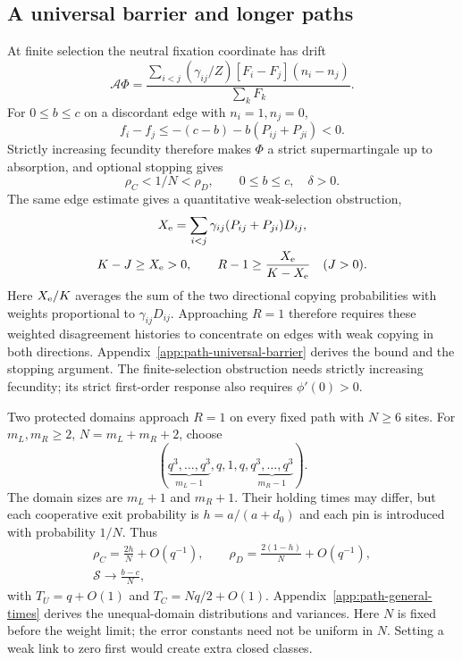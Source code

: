 \documentclass[aps,pre,reprint,amsmath,amssymb,longbibliography]{revtex4-2}
\begin{document}
\subsection{A universal barrier and longer paths}
\label{sec:universal-bound}\label{sec:long-domains}
At finite selection the neutral fixation coordinate has drift
\begin{equation}
 \mathcal A\Phi=
 \frac{\sum_{i<j}(\gamma_{ij}/Z)
        [F_i-F_j](n_i-n_j)}{\sum_kF_k}.
 \label{eq:supermartingale}
\end{equation}
For $0\le b\le c$ on a discordant edge with $n_i=1,n_j=0$,
\begin{equation}
 f_i-f_j\le -(c-b)-b(P_{ij}+P_{ji})<0.
 \label{eq:edge-obstruction}
\end{equation}
Strictly increasing fecundity therefore makes $\Phi$ a strict
supermartingale up to absorption, and optional stopping gives
\begin{equation}
 \rho_C<1/N<\rho_D,\qquad 0\le b\le c,\quad\delta>0.
 \label{eq:finite-no-go}
\end{equation}
The same edge estimate gives a quantitative weak-selection obstruction,
\begin{equation}
 \begin{gathered}
 X_{\rm e}=\sum_{i<j}\gamma_{ij}(P_{ij}+P_{ji})D_{ij},\\
 K-J\ge X_{\rm e}>0,\qquad
 R-1\ge\frac{X_{\rm e}}{K-X_{\rm e}}\quad(J>0).
 \end{gathered}
 \label{eq:edge-gap-bound}
\end{equation}
Here $X_{\rm e}/K$ averages the sum of the two directional copying
probabilities with weights proportional to $\gamma_{ij}D_{ij}$.
Approaching $R=1$ therefore requires these weighted disagreement
histories to concentrate on edges with weak copying in both directions.
Appendix~\ref{app:path-universal-barrier} derives the bound and the
stopping argument. The finite-selection obstruction needs strictly
increasing fecundity; its strict first-order response also requires
$\phi'(0)>0$.

Two protected domains approach $R=1$ on every fixed path with
$N\ge6$ sites. For $m_L,m_R\ge2$, $N=m_L+m_R+2$, choose
\begin{equation}
 (\underbrace{q^3,\ldots,q^3}_{m_L-1},q,1,q,
        \underbrace{q^3,\ldots,q^3}_{m_R-1}).
 \label{eq:long-path}
\end{equation}
The domain sizes are $m_L+1$ and $m_R+1$. Their holding times may
differ, but each cooperative exit probability is $h=a/(a+d_0)$ and
each pin is introduced with probability $1/N$. Thus
\begin{equation}
 \begin{gathered}
 \rho_C=\frac{2h}{N}+O(q^{-1}),\qquad
 \rho_D=\frac{2(1-h)}N+O(q^{-1}),\\
 \mathcal S\longrightarrow\frac{b-c}{N},
 \end{gathered}
 \label{eq:long-path-law}
\end{equation}
with $T_U=q+O(1)$ and $T_C=Nq/2+O(1)$.
Appendix~\ref{app:path-general-times} derives the unequal-domain
distributions and variances. Here $N$ is fixed before the weight limit;
the error constants need not be uniform in $N$. Setting a weak link
to zero first would create extra closed classes.
\end{document}
